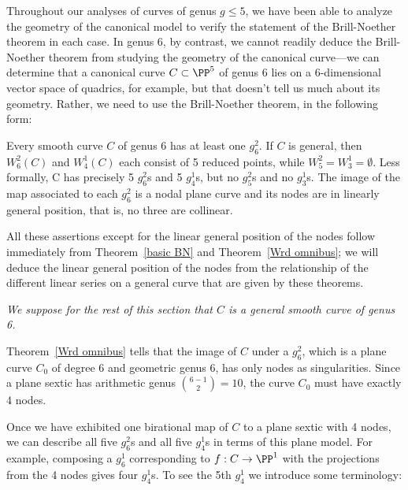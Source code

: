 Throughout our analyses of curves of genus $g \leq 5$, we have been able to analyze the geometry of the canonical model to verify the statement of the Brill-Noether theorem in each case. In genus 6, by contrast, we cannot readily deduce the Brill-Noether theorem from studying the geometry of the canonical curve---we can determine that a canonical curve $C \subset \PP^5$ of genus 6 lies on a 6-dimensional vector space of quadrics, for example, but that doesn't tell us much about its geometry. Rather, we need to use the Brill-Noether theorem, in the following form:

\begin{theorem}\label{BN consequences}
Every smooth curve $C$ of genus 6 has at least one $g^{2}_{6}$. If $C$ is general, then
$W^{2}_{6}(C)$ and $W^{1}_{4}(C)$ each consist of 5 reduced points, while $W^{2}_{5} = W^{1}_{3} = \emptyset$.  Less formally, C has precisely 5 $g^{2}_{6}$s and 5 $g^{1}_{4}$s, but no $g^{2}_{5}$s and no $g^{1}_{3}$s. The image of the map associated to each $g^{2}_{6}$ is a nodal plane curve and its nodes are in linearly general position, that is, no three are collinear.
\end{theorem}

All these assertions except for the linear general position of the nodes follow immediately from 
Theorem~\ref{basic BN} and
Theorem~\ref{Wrd omnibus}; we will deduce the linear general position of the nodes from the relationship of the different
linear series on a general curve that are given by these theorems.


\emph{We suppose for the rest of this section that $C$ is a general smooth curve of genus 6.}

Theorem~\ref{Wrd omnibus} tells that the image of $C$ under a $g^{2}_{6}$, which is a plane curve $C_{0}$ of degree 6 and
geometric genus 6, has only nodes
as singularities. Since a plane sextic has arithmetic genus $\binom{6-1}{2} = 10$, the curve $C_{0}$
must have exactly 4 nodes.

Once we have exhibited one birational map of $C$ to a plane sextic with 4 nodes, we can describe all five $g^2_6$s and all five $g^1_4$s in terms of this plane model. For example, composing a $g^1_6$ corresponding to $f: C\to \PP^1$ with the projections from the 4 nodes gives four $g^1_4$s. To see the 5th $g^{1}_{4}$ we introduce some terminology:

